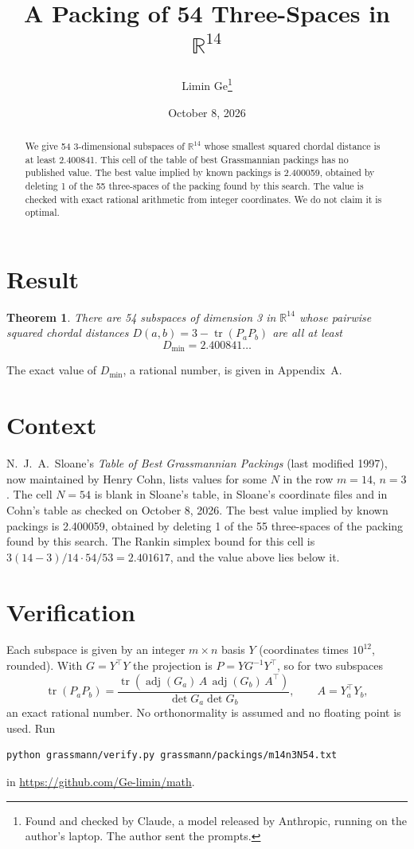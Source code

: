 \documentclass[11pt,a4paper]{article}
\title{A Packing of 54 Three-Spaces in $\mathbb{R}^{14}$}
\author{Limin Ge\thanks{Found and checked by Claude, a model released by Anthropic, running on the author's laptop. The author sent the prompts.}}
\date{October 8, 2026}
\newtheorem*{theorem}{Theorem}
\begin{document}
\maketitle
\begin{abstract}
We give 54 3-dimensional subspaces of $\mathbb{R}^{14}$ whose smallest squared chordal distance is at least 2.400841. This cell of the table of best Grassmannian packings has no published value. The best value implied by known packings is 2.400059, obtained by deleting 1 of the 55 three-spaces of the packing found by this search. The value is checked with exact rational arithmetic from integer coordinates. We do not claim it is optimal.
\end{abstract}

\section{Result}
\begin{theorem}
There are 54 subspaces of dimension 3 in $\mathbb{R}^{14}$ whose pairwise squared chordal distances $D(a,b) = 3 - \operatorname{tr}(P_aP_b)$ are all at least
\[ D_{\min} = 2.400841\ldots \]
\end{theorem}
The exact value of $D_{\min}$, a rational number, is given in Appendix~A.


\section{Context}
N.~J.~A.~Sloane's \emph{Table of Best Grassmannian Packings} (last modified 1997), now maintained by Henry Cohn, lists values for some $N$ in the row $m=14$, $n=3$. The cell $N=54$ is blank in Sloane's table, in Sloane's coordinate files and in Cohn's table as checked on October 8, 2026. The best value implied by known packings is 2.400059, obtained by deleting 1 of the 55 three-spaces of the packing found by this search. The Rankin simplex bound for this cell is $3(14-3)/14\cdot 54/53 = 2.401617$, and the value above lies below it.


\section{Verification}
Each subspace is given by an integer $m\times n$ basis $Y$ (coordinates times $10^{12}$, rounded). With $G=Y^\top Y$ the projection is $P=YG^{-1}Y^\top$, so for two subspaces
\[ \operatorname{tr}(P_aP_b)=\frac{\operatorname{tr}(\operatorname{adj}(G_a)\,A\,\operatorname{adj}(G_b)\,A^\top)}{\det G_a\det G_b},\qquad A=Y_a^\top Y_b, \]
an exact rational number. No orthonormality is assumed and no floating point is used. Run
\begin{verbatim}
python grassmann/verify.py grassmann/packings/m14n3N54.txt
\end{verbatim}
in \url{https://github.com/Ge-limin/math}.
\end{document}
